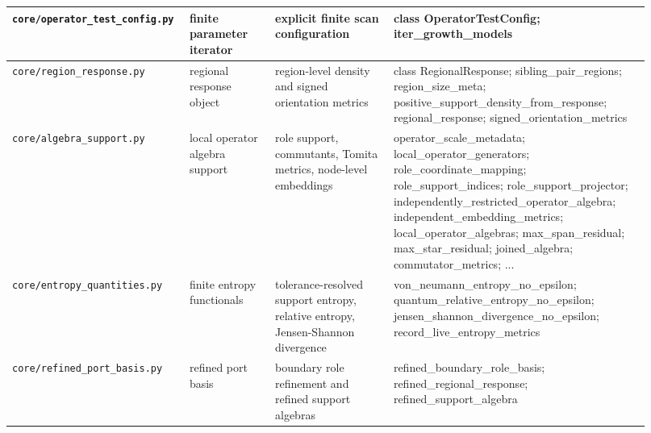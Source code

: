 \documentclass[11pt]{article}
\theoremstyle{remark}
\newcommand{\code}[1]{\texttt{#1}}
\numberwithin{equation}{section}
\begin{document}
\begin{longtable}{>{\raggedright\arraybackslash}p{0.22\linewidth}>{\raggedright\arraybackslash}p{0.13\linewidth}>{\raggedright\arraybackslash}p{0.18\linewidth}>{\raggedright\arraybackslash}p{0.39\linewidth}}
\hline
\code{core/operator\_\allowbreak{}test\_\allowbreak{}config.py} & finite parameter iterator & explicit finite scan configuration & class OperatorTestConfig; iter\_\allowbreak{}growth\_\allowbreak{}models\\
\hline
\code{core/region\_\allowbreak{}response.py} & regional response object & region-level density and signed orientation metrics & class RegionalResponse; sibling\_\allowbreak{}pair\_\allowbreak{}regions; region\_\allowbreak{}size\_\allowbreak{}meta; positive\_\allowbreak{}support\_\allowbreak{}density\_\allowbreak{}from\_\allowbreak{}response; regional\_\allowbreak{}response; signed\_\allowbreak{}orientation\_\allowbreak{}metrics\\
\hline
\code{core/algebra\_\allowbreak{}support.py} & local operator algebra support & role support, commutants, Tomita metrics, node-level embeddings & operator\_\allowbreak{}scale\_\allowbreak{}metadata; local\_\allowbreak{}operator\_\allowbreak{}generators; role\_\allowbreak{}coordinate\_\allowbreak{}mapping; role\_\allowbreak{}support\_\allowbreak{}indices; role\_\allowbreak{}support\_\allowbreak{}projector; independently\_\allowbreak{}restricted\_\allowbreak{}operator\_\allowbreak{}algebra; independent\_\allowbreak{}embedding\_\allowbreak{}metrics; local\_\allowbreak{}operator\_\allowbreak{}algebras; max\_\allowbreak{}span\_\allowbreak{}residual; max\_\allowbreak{}star\_\allowbreak{}residual; joined\_\allowbreak{}algebra; commutator\_\allowbreak{}metrics; ...\\
\hline
\code{core/entropy\_\allowbreak{}quantities.py} & finite entropy functionals & tolerance-resolved support entropy, relative entropy, Jensen-Shannon divergence & von\_\allowbreak{}neumann\_\allowbreak{}entropy\_\allowbreak{}no\_\allowbreak{}epsilon; quantum\_\allowbreak{}relative\_\allowbreak{}entropy\_\allowbreak{}no\_\allowbreak{}epsilon; jensen\_\allowbreak{}shannon\_\allowbreak{}divergence\_\allowbreak{}no\_\allowbreak{}epsilon; record\_\allowbreak{}live\_\allowbreak{}entropy\_\allowbreak{}metrics\\
\hline
\code{core/refined\_\allowbreak{}port\_\allowbreak{}basis.py} & refined port basis & boundary role refinement and refined support algebras & refined\_\allowbreak{}boundary\_\allowbreak{}role\_\allowbreak{}basis; refined\_\allowbreak{}regional\_\allowbreak{}response; refined\_\allowbreak{}support\_\allowbreak{}algebra\\
\bottomrule
\end{longtable}

\newpage
\end{document}
